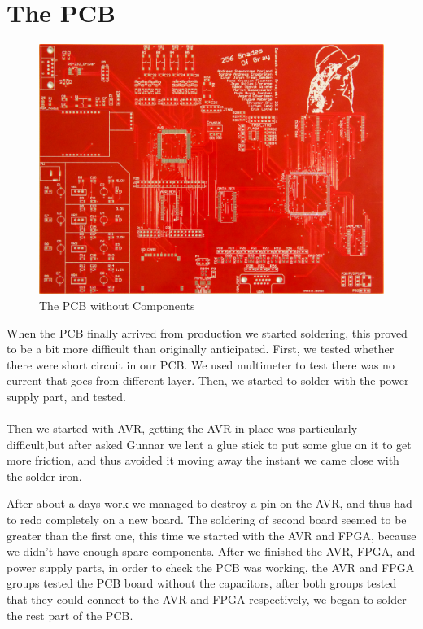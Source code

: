 \section {The PCB}
\begin{figure}[h]
  \centering
  \includegraphics[width=\textwidth]{fig/pcb/pcbwithoutcomp}
  \caption{The PCB without Components}
  \label{fig:figurlabel}
\end{figure}
When the PCB finally arrived from production we started soldering, this proved to be a bit
more difficult than originally anticipated. First, we tested whether there were short circuit in our PCB. We used multimeter to test there was no current that goes from different layer. Then, we started to solder with the power supply part, and tested. \\
\\
Then we started with AVR, getting the AVR in place was particularly difficult,but after asked Gunnar we lent a glue stick to put some glue on it to get more friction, and thus avoided it moving away the instant we came close with the solder iron.

After about a days work we managed to destroy a pin on the AVR, and thus had to redo completely on a new board. The soldering of second board seemed to be greater than the first one, this time we started with the AVR and FPGA, because we didn't have enough spare components. After we finished the AVR, FPGA, and power supply parts, in order to check the PCB was working, the AVR and FPGA groups tested the PCB board without the capacitors, after both groups tested that they could connect to the AVR and FPGA respectively, we began to solder the rest part of the PCB.  

